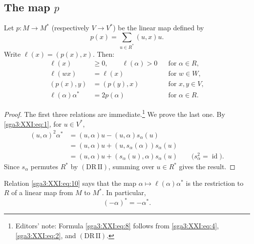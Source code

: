 
\subsection{The map \texorpdfstring{\(p\)}{p}}

\begin{lemma}\label{sga3:XXI:1.2.1}
Let \(p:M\to M^\ast\) (respectively \(V\to V^\ast\)) be the linear map
defined by
\begin{equation}
 p(x)=\sum_{u\in R^\ast}(u,x)u.
 \tag{6}\label{sga3:XXI:eq:6}
\end{equation}
Write \(\ell(x)=(p(x),x)\). Then:
\begin{align}
 \ell(x)&\geq0,\qquad \ell(\alpha)>0
     &&\text{for }\alpha\in R,
 \tag{7}\label{sga3:XXI:eq:7}\\
 \ell(wx)&=\ell(x)
     &&\text{for }w\in W,
 \tag{8}\label{sga3:XXI:eq:8}\\
 (p(x),y)&=(p(y),x)
     &&\text{for }x,y\in V,
 \tag{9}\label{sga3:XXI:eq:9}\\
 \ell(\alpha)\alpha^\ast&=2p(\alpha)
     &&\text{for }\alpha\in R.
 \tag{10}\label{sga3:XXI:eq:10}
\end{align}
\end{lemma}

\begin{proof}
The first three relations are immediate.\footnote{Editors' note:
Formula \eqref{sga3:XXI:eq:8} follows from
\eqref{sga3:XXI:eq:4}, \eqref{sga3:XXI:eq:2}, and
\((\mathrm{DR\,II})\).}
We prove the last one. By \eqref{sga3:XXI:eq:1}, for \(u\in V^\ast\),
\begin{align*}
 (u,\alpha)^2\alpha^\ast
  &=(u,\alpha)u-(u,\alpha)s_\alpha(u)\\
  &=(u,\alpha)u+(u,s_\alpha(\alpha))s_\alpha(u)\\
  &=(u,\alpha)u+(s_\alpha(u),\alpha)s_\alpha(u)
       \qquad\bigl(s_\alpha^2=\operatorname{id}\bigr).
\end{align*}
Since \(s_\alpha\) permutes \(R^\ast\) by
\((\mathrm{DR\,II})\), summing over \(u\in R^\ast\) gives the result.
\end{proof}

\begin{scholium}\label{sga3:XXI:1.2.2}
Relation \eqref{sga3:XXI:eq:10} says that the map
\(\alpha\mapsto\ell(\alpha)\alpha^\ast\) is the restriction to \(R\)
of a linear map from \(M\) to \(M^\ast\). In particular,
\[
 (-\alpha)^\ast=-\alpha^\ast.
\]
\end{scholium}

